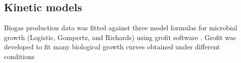\subsection{Kinetic models}
Biogas production data was fitted against three model formulas for microbial growth (Logistic, Gompertz, and Richards) using grofit software \cite{Kahm_2010}. Grofit was developed to fit many biological  growth curves obtained under different
conditions 